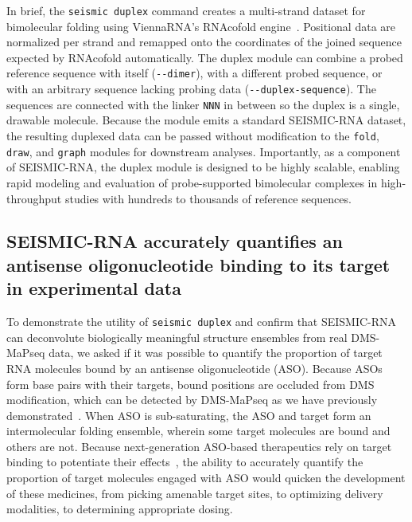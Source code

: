 \documentclass[unnumsec,webpdf,contemporary,large]{oup-authoring-template}%
\theoremstyle{thmstyleone}%
\theoremstyle{thmstyletwo}%
\theoremstyle{thmstylethree}%
\begin{document}
In brief, the \verb|seismic duplex| command creates a multi-strand dataset for bimolecular folding using ViennaRNA's RNAcofold engine~\cite{Lorenz2011,Bernhart2006}. Positional data are normalized per strand and remapped onto the coordinates of the joined sequence expected by RNAcofold automatically. The duplex module can combine a probed reference sequence with itself (\verb|--dimer|), with a different probed sequence, or with an arbitrary sequence lacking probing data (\verb|--duplex-sequence|). The sequences are connected with the linker \verb|NNN| in between so the duplex is a single, drawable molecule. Because the module emits a standard SEISMIC-RNA dataset, the resulting duplexed data can be passed without modification to the \verb|fold|, \verb|draw|, and \verb|graph| modules for downstream analyses. Importantly, as a component of SEISMIC-RNA, the duplex module is designed to be highly scalable, enabling rapid modeling and evaluation of probe-supported bimolecular complexes in high-throughput studies with hundreds to thousands of reference sequences.


\subsection{SEISMIC-RNA accurately quantifies an antisense oligonucleotide binding to its target in experimental data}

To demonstrate the utility of \verb|seismic duplex| and confirm that SEISMIC-RNA can deconvolute biologically meaningful structure ensembles from real DMS-MaPseq data, we asked if it was possible to quantify the proportion of target RNA molecules bound by an antisense oligonucleotide (ASO). Because ASOs form base pairs with their targets, bound positions are occluded from DMS modification, which can be detected by DMS-MaPseq as we have previously demonstrated~\cite{RomeroAgosto2024}. When ASO is sub-saturating, the ASO and target form an intermolecular folding ensemble, wherein some target molecules are bound and others are not. Because next-generation ASO-based therapeutics rely on target binding to potentiate their effects~\cite{Crooke2021}, the ability to accurately quantify the proportion of target molecules engaged with ASO would quicken the development of these medicines, from picking amenable target sites, to optimizing delivery modalities, to determining appropriate dosing.
\end{document}
